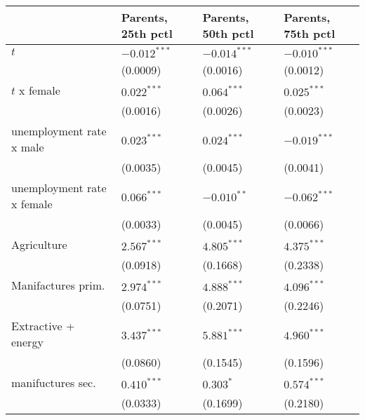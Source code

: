 \begin{tabular}{llll}
\toprule
{} & Parents, 25th pctl & Parents, 50th pctl & Parents, 75th pctl \\
\midrule
$t$                                                &     $-0.012^{***}$ &     $-0.014^{***}$ &     $-0.010^{***}$ \\
                                                   &           (0.0009) &           (0.0016) &           (0.0012) \\
$t$ x female                                       &      $0.022^{***}$ &      $0.064^{***}$ &      $0.025^{***}$ \\
                                                   &           (0.0016) &           (0.0026) &           (0.0023) \\
unemployment rate x male                           &      $0.023^{***}$ &      $0.024^{***}$ &     $-0.019^{***}$ \\
                                                   &           (0.0035) &           (0.0045) &           (0.0041) \\
unemployment rate x female                         &      $0.066^{***}$ &      $-0.010^{**}$ &     $-0.062^{***}$ \\
                                                   &           (0.0033) &           (0.0045) &           (0.0066) \\
Agriculture                                        &      $2.567^{***}$ &      $4.805^{***}$ &      $4.375^{***}$ \\
                                                   &           (0.0918) &           (0.1668) &           (0.2338) \\
Manifactures prim.                                 &      $2.974^{***}$ &      $4.888^{***}$ &      $4.096^{***}$ \\
                                                   &           (0.0751) &           (0.2071) &           (0.2246) \\
Extractive + energy                                &      $3.437^{***}$ &      $5.881^{***}$ &      $4.960^{***}$ \\
                                                   &           (0.0860) &           (0.1545) &           (0.1596) \\
manifuctures sec.                                  &      $0.410^{***}$ &          $0.303^*$ &      $0.574^{***}$ \\
                                                   &           (0.0333) &           (0.1699) &           (0.2180) \\

\end{tabular}
